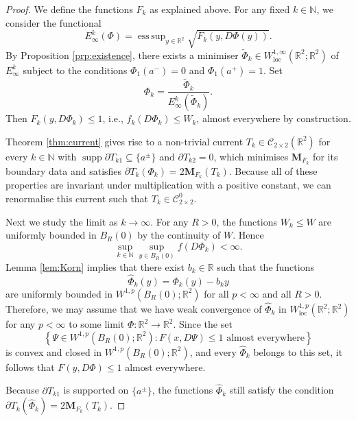 \documentclass[a4paper]{article}
\newcommand{\R}{\mathbb{R}}
\newcommand{\N}{\mathbb{N}}
\newcommand{\M}{\mathbf{M}}
\newcommand{\loc}{\mathrm{loc}}
\newcommand{\ncrt}{\mathcal{C}}
\DeclareMathOperator{\supp}{supp}
\DeclareMathOperator*{\esssup}{ess \, sup}
\newcommand{\set}[2]{\left\{ #1 \colon #2 \right\}}
\theoremstyle{definition}
\theoremstyle{remark}
\begin{document}
\begin{proof}
We define the functions $F_k$ as explained above. For any fixed $k \in \N$, we consider the functional
\[
E_\infty^k(\Phi) = \esssup_{y \in \R^2} \sqrt{F_k(y, D\Phi(y))}.
\]
By Proposition \ref{prp:existence}, there exists a minimiser
$\tilde{\Phi}_k \in W_\loc^{1, \infty}(\R^2; \R^2)$ of $E_\infty^k$
subject to the conditions $\Phi_1(a^-) = 0$ and $\Phi_1(a^+) = 1$. Set
\[
\Phi_k = \frac{\tilde{\Phi}_k}{E_\infty^k(\tilde{\Phi}_k)}.
\]
Then $F_k(y, D\Phi_k) \le 1$, i.e., $f_k(D\Phi_k) \le W_k$, almost everywhere by construction.

Theorem \ref{thm:current} gives rise to a non-trivial current $T_k \in \ncrt_{2 \times 2}(\R^2)$
for every $k \in \N$ with $\supp \partial T_{k 1} \subseteq \{a^\pm\}$ and $\partial T_{k 2} = 0$,
which minimises $\M_{F_k}$ for its boundary data and satisfies
$\partial T_k(\Phi_k) = 2 \M_{F_k}(T_k)$. Because all of these
properties are invariant under multiplication with a positive constant, we can renormalise this
current such that $T_k \in \ncrt_{2 \times 2}^0$.

Next we study the limit as $k \to \infty$.
For any $R > 0$, the functions $W_k \le W$ are uniformly bounded in
$B_R(0)$ by the continuity of $W$. Hence
\[
\sup_{k \in \N} \sup_{y \in B_R(0)} f(D\Phi_k) < \infty.
\]
Lemma \ref{lem:Korn} implies that there
exist $b_k \in \R$ such that the functions
\[
\hat{\Phi}_k(y) = \Phi_k(y) - b_k y
\]
are uniformly bounded in $W^{1, p}(B_R(0); \R^2)$ for all $p < \infty$ and all
$R > 0$. Therefore, we may assume that we have weak convergence of $\hat{\Phi}_k$ in
$W_\loc^{1, p}(\R^2; \R^2)$ for any $p < \infty$ to some limit
$\Phi \colon \R^2 \to \R^2$. Since the set
\[
\set{\Psi \in W^{1, p}(B_R(0); \R^2)}{F(x, D\Psi) \le 1 \text{ almost everywhere}}
\]
is convex and closed in $W^{1, p}(B_R(0); \R^2)$, and every $\hat{\Phi}_k$
belongs to this set, it follows that $F(y, D\Phi) \le 1$ almost everywhere.

Because $\partial T_{k 1}$ is supported on $\{a^\pm\}$, the functions
$\hat{\Phi}_k$ still satisfy the condition
$\partial T_k(\hat{\Phi}_k) = 2 \M_{F_k}(T_k)$.


\end{proof}
\end{document}
